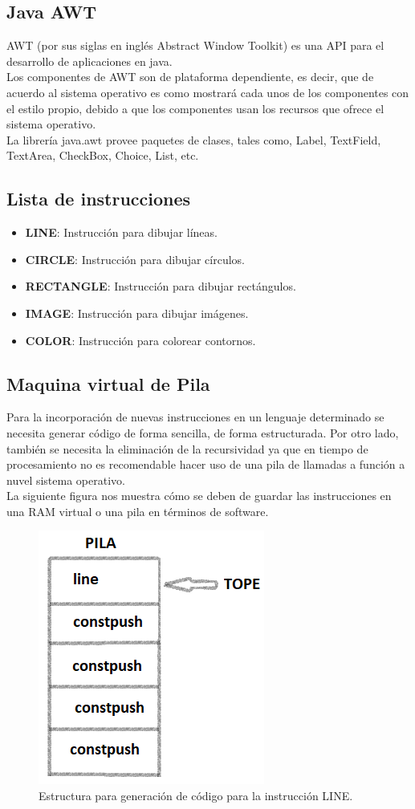 \subsection{Java AWT}

AWT (por sus siglas en inglés Abstract Window Toolkit) es una API para 
el desarrollo de aplicaciones en java. \\
Los componentes de AWT son de plataforma dependiente, es decir, que de acuerdo
al sistema operativo es como mostrará cada unos de los componentes con el estilo 
propio, debido a que los componentes usan los recursos que ofrece el sistema 
operativo.\\
La librería java.awt provee paquetes de clases, tales como, Label, TextField, 
TextArea, CheckBox, Choice, List, etc. \\

\subsection{Lista de instrucciones}
\begin{itemize}
	\item \textbf{LINE}: Instrucción para dibujar líneas.
	\item \textbf{CIRCLE}: Instrucción para dibujar círculos.
	\item \textbf{RECTANGLE}: Instrucción para dibujar rectángulos.
	\item \textbf{IMAGE}: Instrucción para dibujar imágenes.
	\item \textbf{COLOR}: Instrucción para colorear contornos.
\end{itemize}

\subsection{Maquina virtual de Pila}
Para la incorporación de nuevas instrucciones en un lenguaje determinado se necesita 
generar código de forma sencilla, de forma estructurada. Por otro lado, también se 
necesita la eliminación de la recursividad ya que en tiempo de procesamiento no es
recomendable hacer uso de una pila de llamadas a función a nuvel sistema operativo. \\
La siguiente figura nos muestra cómo se deben de guardar las instrucciones en una
RAM virtual o una pila en términos de software.

\begin{figure}[H]
	\begin{center}
		\includegraphics[scale=0.9]{images/img_estr_stack}
		\caption{Estructura para generación de código para la instrucción LINE.}
	\end{center}
\end{figure}